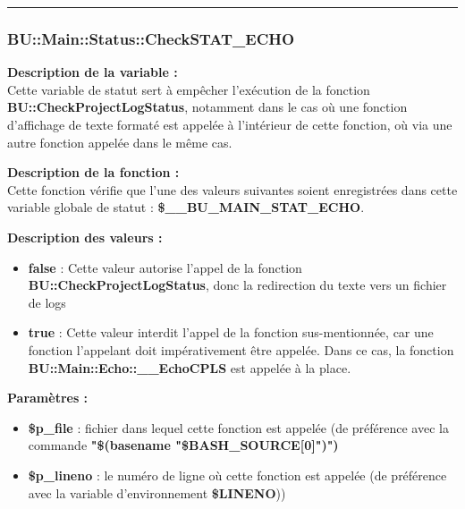 \documentclass[a4paper,10pt]{article}
\begin{document}

\color{blue}\par\noindent\rule{\textwidth}{0.4pt}\color{white}

\color{blue}
\subsubsection{\color{mauve}BU::Main::Status::CheckSTAT\_ECHO}\color{white}

\begin{justify}
    \textbf{Description de la variable :}\\
    Cette variable de statut sert à empêcher l'exécution de la fonction \textbf{\color{mauve}BU::CheckProjectLogStatus}, notamment dans le cas où une fonction d'affichage de texte formaté est appelée à l'intérieur de cette fonction, où via une autre fonction appelée dans le même cas.
\end{justify}

\begin{justify}
    \textbf{Description de la fonction :}\\
    Cette fonction vérifie que l'une des valeurs suivantes soient enregistrées dans cette variable globale de statut : \textbf{\color{orange}\$\_\_BU\_MAIN\_STAT\_ECHO}.
\end{justify}

\begin{justify}
    \textbf{Description des valeurs :}

    \begin{itemize}
        \item \textbf{false} : Cette valeur autorise l'appel de la fonction \textbf{\color{mauve}BU::CheckProjectLogStatus}, donc la redirection du texte vers un fichier de logs\\

        \item \textbf{true} : Cette valeur interdit l'appel de la fonction sus-mentionnée, car une fonction l'appelant doit impérativement être appelée. Dans ce cas, la fonction \textbf{\color{mauve}BU::Main::Echo::\_\_EchoCPLS} est appelée à la place.
    \end{itemize}

\end{justify}

\begin{justify}
    \textbf{Paramètres :}

    \begin{itemize}
        \item \color{orange}\textbf{\$p\_file}\color{white} : fichier dans lequel cette fonction est appelée (de préférence avec la commande \textbf{"\$(\color{gray}basename \color{white}"\color{orange}\$BASH\_SOURCE[0]\color{white}")")}\\

        \item \color{orange}\textbf{\$p\_lineno}\color{white} : le numéro de ligne où cette fonction est appelée (de préférence avec la variable d'environnement \textbf{\color{orange}\$LINENO}))
    \end{itemize}
\end{justify}
\end{document}
